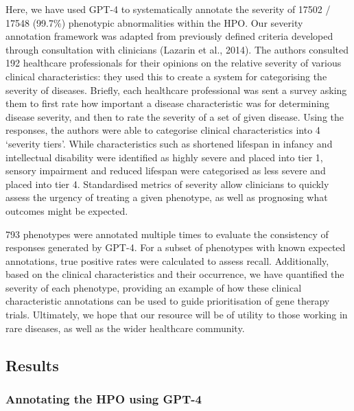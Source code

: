\documentclass[
]{agujournal2019}
\begin{document}
Here, we have used GPT-4 to systematically annotate the severity of
17502 / 17548 (99.7\%) phenotypic abnormalities within the HPO. Our
severity annotation framework was adapted from previously defined
criteria developed through consultation with clinicians (Lazarin et al.,
2014). The authors consulted 192 healthcare professionals for their
opinions on the relative severity of various clinical characteristics:
they used this to create a system for categorising the severity of
diseases. Briefly, each healthcare professional was sent a survey asking
them to first rate how important a disease characteristic was for
determining disease severity, and then to rate the severity of a set of
given disease. Using the responses, the authors were able to categorise
clinical characteristics into 4 `severity tiers'. While characteristics
such as shortened lifespan in infancy and intellectual disability were
identified as highly severe and placed into tier 1, sensory impairment
and reduced lifespan were categorised as less severe and placed into
tier 4. Standardised metrics of severity allow clinicians to quickly
assess the urgency of treating a given phenotype, as well as prognosing
what outcomes might be expected.

793 phenotypes were annotated multiple times to evaluate the consistency
of responses generated by GPT-4. For a subset of phenotypes with known
expected annotations, true positive rates were calculated to assess
recall. Additionally, based on the clinical characteristics and their
occurrence, we have quantified the severity of each phenotype, providing
an example of how these clinical characteristic annotations can be used
to guide prioritisation of gene therapy trials. Ultimately, we hope that
our resource will be of utility to those working in rare diseases, as
well as the wider healthcare community.

\subsection{Results}\label{results}

\subsubsection{Annotating the HPO using
GPT-4}\label{annotating-the-hpo-using-gpt-4}
\end{document}
